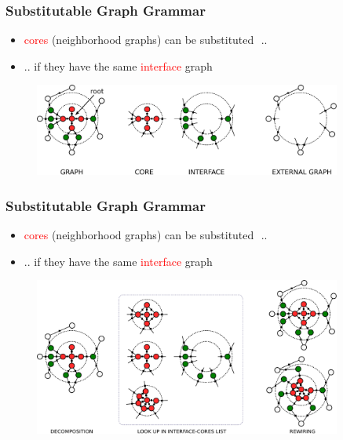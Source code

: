 \documentclass{beamer}
\newcommand{\red}[1]{\textcolor{red}{#1}}
\begin{document}
\begin{frame}
    \frametitle{Substitutable Graph Grammar}
    \begin{itemize}
        \item \red{cores} (neighborhood graphs) can be substituted  ..
        \item .. if they have the same \red{interface} graph
    \end{itemize}
    \begin{figure}[ht]
        \centering
        \includegraphics[width=0.9\textwidth]{images/cip1.pdf}
    \end{figure}
\end{frame}

\begin{frame}
    \frametitle{Substitutable Graph Grammar}
    \begin{itemize}
        \item \red{cores} (neighborhood graphs) can be substituted  ..
        \item .. if they have the same \red{interface} graph
    \end{itemize}
    \begin{figure}[ht]
        \centering
        \includegraphics[width=0.9\textwidth]{images/cip2.pdf}
    \end{figure}
\end{frame}



\end{document}
